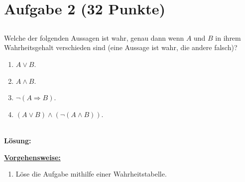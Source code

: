 \section*{Aufgabe 2 (32 Punkte)}
\vspace{0.4cm}
\subsection*{}
Welche der folgenden Aussagen ist wahr, genau dann wenn $ A $ und $ B $ in ihrem Wahrheitsgehalt verschieden sind (eine Aussage ist wahr, die andere falsch)?
\renewcommand{\labelenumi}{(\alph{enumi})}
\begin{enumerate}
	\item $ A \vee B $.
	\item $ A \wedge B $.
	\item $ \neg (A \Rightarrow B) $.
	\item $ (A \vee B) \wedge (\neg(A \wedge B)) $.
\end{enumerate}\ \\
\textbf{Lösung:}
\begin{mdframed}
\underline{\textbf{Vorgehensweise:}}
\renewcommand{\labelenumi}{\theenumi.}
\begin{enumerate}
\item Löse die Aufgabe mithilfe einer Wahrheitstabelle.
\end{enumerate}
\end{mdframed}

